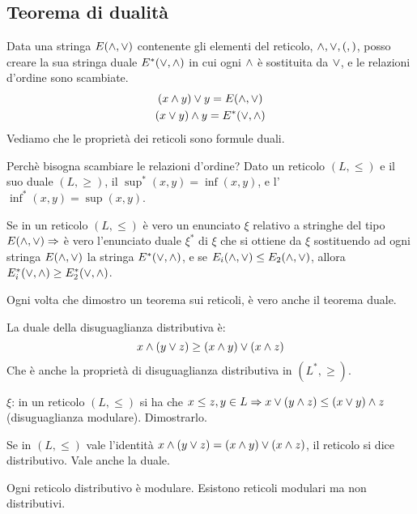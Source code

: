 \subsection{Teorema di dualit\`a}
Data una stringa $E(\wedge, \vee)$ contenente gli elementi del reticolo, $\wedge, \vee, (, )$, posso creare la sua stringa duale $E^{\ast} (\vee, \wedge)$ in cui ogni $\wedge$ \`e sostituita da $\vee$, e le relazioni d'ordine sono scambiate.
\begin{gather*}
(x \wedge y) \vee y = E(\wedge, \vee) \\
(x \vee y) \wedge y = E^{\ast} (\vee, \wedge)
\end{gather*}
Vediamo che le propriet\`a dei reticoli sono formule duali.

Perch\`e bisogna scambiare le relazioni d'ordine? Dato un reticolo $(L, \le)$ e il suo duale $(L, \ge)$, il $\sup^{\ast} (x,y) = \inf(x,y)$, e l'$\inf^{\ast}(x,y) = \sup(x,y)$.

\begin{theorem}[Dualit\`a]
Se in un reticolo $(L, \le)$ \`e vero un enunciato $\xi$ relativo a stringhe del tipo $E(\wedge, \vee) \Rightarrow $ \`e vero l'enunciato duale $\xi^{\ast}$ di $\xi$ che si ottiene da $\xi$ sostituendo ad ogni stringa $E(\wedge, \vee)$ la stringa $E^{\ast}(\vee, \wedge)$, e se $E_i (\wedge, \vee) \le E_2 (\wedge, \vee)$, allora $E_i^{\ast} (\vee, \wedge) \ge E_2^{\ast} (\vee, \wedge)$.
\end{theorem}
Ogni volta che dimostro un teorema sui reticoli, \`e vero anche il teorema duale. 

La duale della disuguaglianza distributiva \`e:
\[
x \wedge (y \vee z) \ge (x \wedge y) \vee (x \wedge z)
\]
Che \`e anche la propriet\`a di disuguaglianza distributiva in $(L^{\ast}, \ge)$.

\begin{esercizio}
$\xi$: in un reticolo $(L, \le)$ si ha che $x \le z, y \in L \Rightarrow x \vee (y \wedge z) \le (x \vee y) \wedge z$ (disuguaglianza modulare). Dimostrarlo.
\end{esercizio}

\begin{defn}
Se in $(L, \le)$ vale l'identit\`a $x \wedge (y \vee z) = (x \wedge y) \vee (x \wedge z)$, il reticolo si dice distributivo. Vale anche la duale.
\end{defn}

Ogni reticolo distributivo \`e modulare. Esistono reticoli modulari ma non distributivi.

